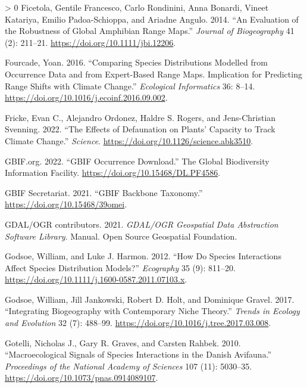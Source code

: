 \documentclass[10pt,oneside]{article}
\newlength{\cslhangindent}
\newenvironment{CSLReferences}[3] %
 {%
  \setlength{\parindent}{0pt}
  \ifodd #1 \everypar{\setlength{\hangindent}{\cslhangindent}}\ignorespaces\fi
  \ifnum #2 > 0
  \setlength{\parskip}{#2\baselineskip}
  \fi
 }%
 {}
\begin{document}
\begin{CSLReferences}{1}{0}
\leavevmode\hypertarget{ref-Ficetola2014EvaRob}{}%
Ficetola, Gentile Francesco, Carlo Rondinini, Anna Bonardi, Vineet
Katariya, Emilio Padoa-Schioppa, and Ariadne Angulo. 2014. {``An
Evaluation of the Robustness of Global Amphibian Range Maps.''}
\emph{Journal of Biogeography} 41 (2): 211--21.
\url{https://doi.org/10.1111/jbi.12206}.

\leavevmode\hypertarget{ref-Fourcade2016ComSpe}{}%
Fourcade, Yoan. 2016. {``Comparing Species Distributions Modelled from
Occurrence Data and from Expert-Based Range Maps. Implication for
Predicting Range Shifts with Climate Change.''} \emph{Ecological
Informatics} 36: 8--14.
\url{https://doi.org/10.1016/j.ecoinf.2016.09.002}.

\leavevmode\hypertarget{ref-Fricke2022EffDef}{}%
Fricke, Evan C., Alejandro Ordonez, Haldre S. Rogers, and Jens-Christian
Svenning. 2022. {``The Effects of Defaunation on Plants' Capacity to
Track Climate Change.''} \emph{Science}.
\url{https://doi.org/10.1126/science.abk3510}.

\leavevmode\hypertarget{ref-GBIF.org2022GbiOcc}{}%
GBIF.org. 2022. {``GBIF Occurrence Download.''} The Global Biodiversity
Information Facility. \url{https://doi.org/10.15468/DL.PF4586}.

\leavevmode\hypertarget{ref-GBIFSecretariat2021GbiBac}{}%
GBIF Secretariat. 2021. {``GBIF Backbone Taxonomy.''}
\url{https://doi.org/10.15468/39omei}.

\leavevmode\hypertarget{ref-GDALux2fOGRcontributors2021GdaOgr}{}%
GDAL/OGR contributors. 2021. \emph{GDAL/OGR Geospatial Data Abstraction
Software Library}. Manual. Open Source Geospatial Foundation.

\leavevmode\hypertarget{ref-Godsoe2012HowSpe}{}%
Godsoe, William, and Luke J. Harmon. 2012. {``How Do Species
Interactions Affect Species Distribution Models?''} \emph{Ecography} 35
(9): 811--20. \url{https://doi.org/10.1111/j.1600-0587.2011.07103.x}.

\leavevmode\hypertarget{ref-Godsoe2017IntBio}{}%
Godsoe, William, Jill Jankowski, Robert D. Holt, and Dominique Gravel.
2017. {``Integrating Biogeography with Contemporary Niche Theory.''}
\emph{Trends in Ecology and Evolution} 32 (7): 488--99.
\url{https://doi.org/10.1016/j.tree.2017.03.008}.

\leavevmode\hypertarget{ref-Gotelli2010MacSig}{}%
Gotelli, Nicholas J., Gary R. Graves, and Carsten Rahbek. 2010.
{``Macroecological Signals of Species Interactions in the Danish
Avifauna.''} \emph{Proceedings of the National Academy of Sciences} 107
(11): 5030--35. \url{https://doi.org/10.1073/pnas.0914089107}.


\end{CSLReferences}
\end{document}
